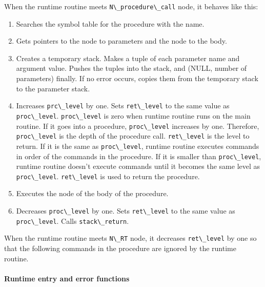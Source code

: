 When the runtime routine meets
\passthrough{\lstinline!N\_procedure\_call!} node, it behaves like this:

\begin{enumerate}
\def\labelenumi{\arabic{enumi}.}
\tightlist
\item
  Searches the symbol table for the procedure with the name.
\item
  Gets pointers to the node to parameters and the node to the body.
\item
  Creates a temporary stack. Makes a tuple of each parameter name and
  argument value. Pushes the tuples into the stack, and (NULL, number of
  parameters) finally. If no error occurs, copies them from the
  temporary stack to the parameter stack.
\item
  Increases \passthrough{\lstinline!prc\_level!} by one. Sets
  \passthrough{\lstinline!ret\_level!} to the same value as
  \passthrough{\lstinline!proc\_level!}.
  \passthrough{\lstinline!proc\_level!} is zero when runtime routine
  runs on the main routine. If it goes into a procedure,
  \passthrough{\lstinline!proc\_level!} increases by one. Therefore,
  \passthrough{\lstinline!proc\_level!} is the depth of the procedure
  call. \passthrough{\lstinline!ret\_level!} is the level to return. If
  it is the same as \passthrough{\lstinline!proc\_level!}, runtime
  routine executes commands in order of the commands in the procedure.
  If it is smaller than \passthrough{\lstinline!proc\_level!}, runtime
  routine doesn't execute commands until it becomes the same level as
  \passthrough{\lstinline!proc\_level!}.
  \passthrough{\lstinline!ret\_level!} is used to return the procedure.
\item
  Executes the node of the body of the procedure.
\item
  Decreases \passthrough{\lstinline!proc\_level!} by one. Sets
  \passthrough{\lstinline!ret\_level!} to the same value as
  \passthrough{\lstinline!proc\_level!}. Calls
  \passthrough{\lstinline!stack\_return!}.
\end{enumerate}

When the runtime routine meets \passthrough{\lstinline!N\_RT!} node, it
decreases \passthrough{\lstinline!ret\_level!} by one so that the
following commands in the procedure are ignored by the runtime routine.

\paragraph{Runtime entry and error
functions}\label{runtime-entry-and-error-functions}

